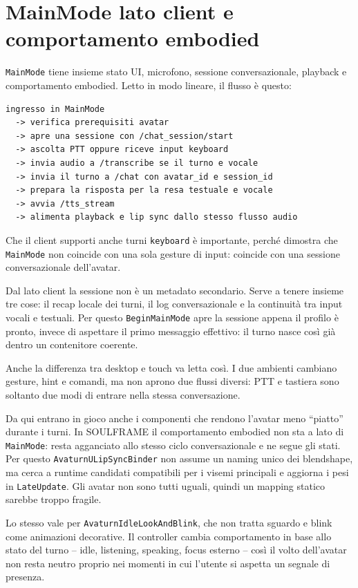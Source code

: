 \section{MainMode lato client e comportamento embodied}
\texttt{MainMode} tiene insieme stato UI, microfono, sessione conversazionale, playback e comportamento embodied. Letto in modo lineare, il flusso è questo:

\begin{lstlisting}[basicstyle=\ttfamily\small,breaklines=true]
ingresso in MainMode
  -> verifica prerequisiti avatar
  -> apre una sessione con /chat_session/start
  -> ascolta PTT oppure riceve input keyboard
  -> invia audio a /transcribe se il turno e vocale
  -> invia il turno a /chat con avatar_id e session_id
  -> prepara la risposta per la resa testuale e vocale
  -> avvia /tts_stream
  -> alimenta playback e lip sync dallo stesso flusso audio
\end{lstlisting}

Che il client supporti anche turni \texttt{keyboard} è importante, perché dimostra che \texttt{MainMode} non coincide con una sola gesture di input: coincide con una sessione conversazionale dell'avatar.

Dal lato client la sessione non è un metadato secondario. Serve a tenere insieme tre cose: il recap locale dei turni, il log conversazionale e la continuità tra input vocali e testuali. Per questo \texttt{BeginMainMode} apre la sessione appena il profilo è pronto, invece di aspettare il primo messaggio effettivo: il turno nasce così già dentro un contenitore coerente.

Anche la differenza tra desktop e touch va letta così. I due ambienti cambiano gesture, hint e comandi, ma non aprono due flussi diversi: PTT e tastiera sono soltanto due modi di entrare nella stessa conversazione.

Da qui entrano in gioco anche i componenti che rendono l'avatar meno ``piatto'' durante i turni. In SOULFRAME il comportamento embodied non sta a lato di \texttt{MainMode}: resta agganciato allo stesso ciclo conversazionale e ne segue gli stati. Per questo \texttt{AvaturnULipSyncBinder} non assume un naming unico dei blendshape, ma cerca a runtime candidati compatibili per i visemi principali e aggiorna i pesi in \texttt{LateUpdate}. Gli avatar non sono tutti uguali, quindi un mapping statico sarebbe troppo fragile.

Lo stesso vale per \texttt{AvaturnIdleLookAndBlink}, che non tratta sguardo e blink come animazioni decorative. Il controller cambia comportamento in base allo stato del turno -- idle, listening, speaking, focus esterno -- così il volto dell'avatar non resta neutro proprio nei momenti in cui l'utente si aspetta un segnale di presenza.

